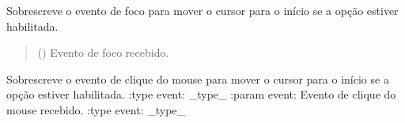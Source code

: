 \documentclass[letterpaper,10pt,english]{sphinxmanual}
\begin{document}
\begin{fulllineitems}
\begin{fulllineitems}
\label{\detokenize{api/dialogs:dialogs.CursorStartLineEdit.focusInEvent}}
\pysigstartsignatures
\pysiglinewithargsret
{}
{}
{}
\pysigstopsignatures
\sphinxAtStartPar
Sobrescreve o evento de foco para mover o cursor para o início se a opção estiver habilitada.
\begin{quote}\begin{description}
\sphinxAtStartPar
{} () \textendash{} Evento de foco recebido.

\end{description}\end{quote}

\end{fulllineitems}


\begin{fulllineitems}
\label{\detokenize{api/dialogs:dialogs.CursorStartLineEdit.mousePressEvent}}
\pysigstartsignatures
\pysiglinewithargsret
{}
{}
{}
\pysigstopsignatures
\sphinxAtStartPar
Sobrescreve o evento de clique do mouse para mover o cursor para o início se a opção estiver habilitada.
:type event: \_type\_
:param event: Evento de clique do mouse recebido.
:type event: \_type\_

\end{fulllineitems}


\end{fulllineitems}

\end{document}
